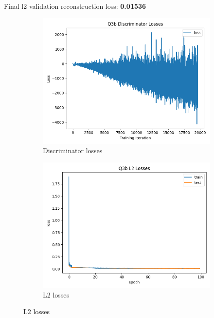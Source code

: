 \documentclass{article}
\begin{document}
Final l2 validation reconstruction loss: \textbf{0.01536} \\
\begin{figure}[H]
    \centering
    \begin{subfigure}{0.45\textwidth}
        \centering
        \includegraphics[width=\textwidth]{figures/q3b_gan_losses.png}
        \caption{Discriminator losses}
    \end{subfigure}
    \begin{subfigure}{0.45\textwidth}
        \centering
        \includegraphics[width=\textwidth]{figures/q3b_l2_losses.png}
        \caption{L2 losses}
    \end{subfigure}

\end{figure}
\end{document}
